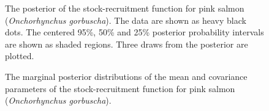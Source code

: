 
\begin{figure}
    \centering
    \caption{The posterior of the stock-recruitment function for pink salmon (\emph{Onchorhynchus gorbuscha}). The data are shown as heavy black dots. The centered 95\%, 50\% and 25\% posterior probability intervals are shown as shaded regions. Three draws from the posterior are plotted.}
    \label{fig:pinkfpost}
\end{figure}

\begin{figure}
    \centering
    \caption{The marginal posterior distributions of the mean and covariance parameters of the stock-recruitment function for pink salmon (\emph{Onchorhynchus gorbuscha}).}
    \label{fig:pinkparams}
\end{figure}

